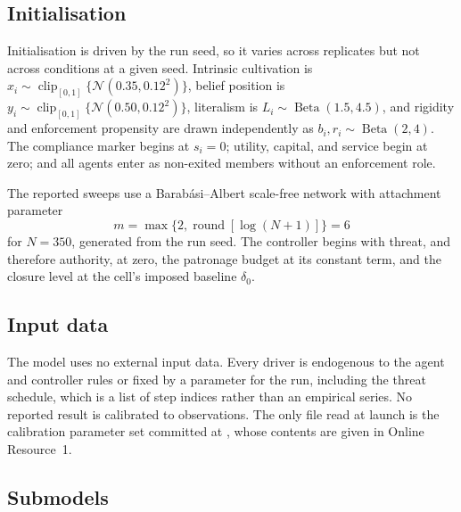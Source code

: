 \documentclass[12pt]{article}
\begin{document}
\subsection{Initialisation}

Initialisation is driven by the run seed, so it varies across replicates but not
across conditions at a given seed. Intrinsic
cultivation is \(x_i\sim\operatorname{clip}_{[0,1]}\{\mathcal{N}(0.35,0.12^2)\}\),
belief position is
\(y_i\sim\operatorname{clip}_{[0,1]}\{\mathcal{N}(0.50,0.12^2)\}\), literalism
is \(L_i\sim\operatorname{Beta}(1.5,4.5)\), and rigidity and enforcement
propensity are drawn independently as
\(b_i,r_i\sim\operatorname{Beta}(2,4)\). The compliance marker begins at
\(s_i=0\); utility, capital, and service begin at zero; and all agents enter as
non-exited members without an enforcement role.

The reported sweeps use a Barab\'asi--Albert scale-free network with attachment
parameter
\begin{equation}
 m=\max\{2,\operatorname{round}[\log(N+1)]\}=6
\end{equation}
for \(N=350\), generated from the run seed. The controller begins with threat,
and therefore authority, at zero, the patronage budget at its constant term, and
the closure level at the cell's imposed baseline \(\delta_0\).

\subsection{Input data}

The model uses no external input data. Every driver is endogenous to the agent
and controller rules or fixed by a parameter for the run, including the threat
schedule, which is a list of step indices rather than an empirical series. No
reported result is calibrated to observations. The only file read at launch is
the calibration parameter set committed at
, whose contents are given in Online
Resource~1.

\subsection{Submodels}
\end{document}
